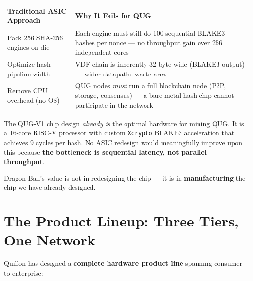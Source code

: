 \documentclass[11pt,a4paper]{article}
\begin{document}
\begin{center}
\begin{tabular}{@{}p{5cm}p{9cm}@{}}
\toprule
\textbf{Traditional ASIC Approach} & \textbf{Why It Fails for QUG} \\
\midrule
Pack 256 SHA-256 engines on die & Each engine must still do 100 sequential BLAKE3 hashes per nonce --- no throughput gain over 256 independent cores \\
Optimize hash pipeline width & VDF chain is inherently 32-byte wide (BLAKE3 output) --- wider datapaths waste area \\
Remove CPU overhead (no OS) & QUG nodes \textit{must} run a full blockchain node (P2P, storage, consensus) --- a bare-metal hash chip cannot participate in the network \\
\bottomrule
\end{tabular}
\end{center}

\begin{successbox}
The QUG-V1 chip design \textit{already is} the optimal hardware for mining QUG. It is a 16-core RISC-V processor with custom \texttt{Xcrypto} BLAKE3 acceleration that achieves 9 cycles per hash. No ASIC redesign would meaningfully improve upon this because \textbf{the bottleneck is sequential latency, not parallel throughput}.

Dragon Ball's value is not in redesigning the chip --- it is in \textbf{manufacturing} the chip we have already designed.
\end{successbox}


\section{The Product Lineup: Three Tiers, One Network}

Quillon has designed a \textbf{complete hardware product line} spanning consumer to enterprise:
\end{document}
